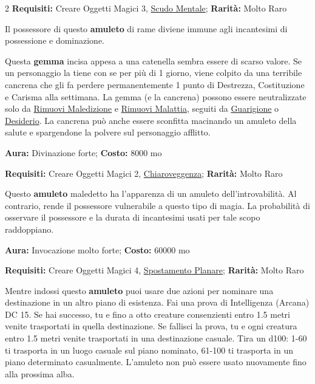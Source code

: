 \begin{multicols}{2}
\textbf{Requisiti:} Creare Oggetti Magici 3, \hyperlink{Scudo Mentale}{Scudo Mentale}; \textbf{Rarità:} Molto Raro

Il possessore di questo \textbf{amuleto} di rame diviene immune agli incantesimi di possessione e dominazione.


Questa \textbf{gemma} incisa appesa a una catenella sembra essere di scarso valore. Se un personaggio la tiene con se per più di 1 giorno, viene colpito da una terribile cancrena che gli fa perdere permanentemente 1 punto di Destrezza, Costituzione e Carisma alla settimana. La gemma (e la cancrena) possono essere neutralizzate solo da \hyperlink{Rimuovi Maledizione}{Rimuovi Maledizione} e \hyperlink{Rimuovi Malattia}{Rimuovi Malattia}, seguiti da \hyperlink{Guarigione}{Guarigione} o \hyperlink{Desiderio}{Desiderio}. La cancrena può anche essere sconfitta macinando un amuleto della salute e spargendone la polvere sul personaggio afflitto.


\textbf{Aura:} Divinazione forte; \textbf{Costo:} 8000 mo

\textbf{Requisiti:} Creare Oggetti Magici 2, \hyperlink{Chiaroveggenza}{Chiaroveggenza}; \textbf{Rarità:} Molto Raro

Questo \textbf{amuleto} maledetto ha l'apparenza di un amuleto dell'introvabilità. Al contrario, rende il possessore vulnerabile a questo tipo di magia. La probabilità di osservare il possessore e la durata di incantesimi usati per tale scopo raddoppiano.


\textbf{Aura:} Invocazione molto forte; \textbf{Costo:} 60000 mo

\textbf{Requisiti:} Creare Oggetti Magici 4, \hyperlink{Spostamento Planare}{Spostamento Planare}; \textbf{Rarità:} Molto Raro

Mentre indossi questo \textbf{amuleto} puoi usare due azioni per nominare una destinazione in un altro piano di esistenza. Fai una prova di Intelligenza (Arcana) DC 15. Se hai successo, tu e fino a otto creature consenzienti entro 1.5 metri venite trasportati in quella destinazione. Se fallisci la prova, tu e ogni creatura entro 1.5 metri venite trasportati in una destinazione casuale. Tira un d100: 1-60 ti trasporta in un luogo casuale sul piano nominato, 61-100 ti trasporta in un piano determinato casualmente. L'amuleto non può essere usato nuovamente fino alla prossima alba.


\end{multicols}
